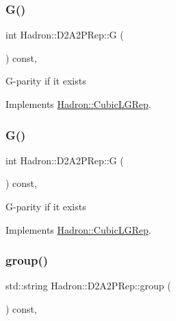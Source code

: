 \subsubsection{\texorpdfstring{G()}{G()}\hspace{0.1cm}{\footnotesize\ttfamily [2/3]}}
{\footnotesize\ttfamily int Hadron\+::\+D2\+A2\+P\+Rep\+::G (\begin{DoxyParamCaption}{ }\end{DoxyParamCaption}) const\hspace{0.3cm}{\ttfamily [inline]}, {\ttfamily [virtual]}}

G-\/parity if it exists 

Implements \mbox{\hyperlink{structHadron_1_1CubicLGRep_ace26f7b2d55e3a668a14cb9026da5231}{Hadron\+::\+Cubic\+L\+G\+Rep}}.

\mbox{\label{structHadron_1_1D2A2PRep_aa0b832a72029fb46f658a4e726cd5cfb}} 
\subsubsection{\texorpdfstring{G()}{G()}\hspace{0.1cm}{\footnotesize\ttfamily [3/3]}}
{\footnotesize\ttfamily int Hadron\+::\+D2\+A2\+P\+Rep\+::G (\begin{DoxyParamCaption}{ }\end{DoxyParamCaption}) const\hspace{0.3cm}{\ttfamily [inline]}, {\ttfamily [virtual]}}

G-\/parity if it exists 

Implements \mbox{\hyperlink{structHadron_1_1CubicLGRep_ace26f7b2d55e3a668a14cb9026da5231}{Hadron\+::\+Cubic\+L\+G\+Rep}}.

\mbox{\label{structHadron_1_1D2A2PRep_a4268c85ec8e19cbb8d02a4ff1fe784c0}} 
\subsubsection{\texorpdfstring{group()}{group()}\hspace{0.1cm}{\footnotesize\ttfamily [1/3]}}
{\footnotesize\ttfamily std\+::string Hadron\+::\+D2\+A2\+P\+Rep\+::group (\begin{DoxyParamCaption}{ }\end{DoxyParamCaption}) const\hspace{0.3cm}{\ttfamily [inline]}, {\ttfamily [virtual]}}

